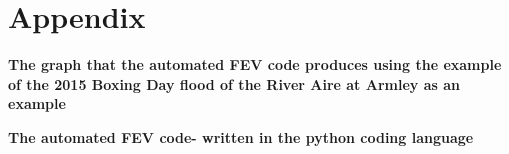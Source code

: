 \documentclass[11pt,a4paper]{article}
\begin{document}
\newpage
\appendix
\section{Appendix}
{\bf The graph that the automated FEV code produces using the example of the 2015 Boxing Day flood of the River Aire at Armley as an example}\\
\begin{figure}[H]
\begin{center}
\end{center}
\end{figure}
{\bf The automated FEV code- written in the python coding language}\\
\begin{spacing}{1}\footnotesize{}
\end{spacing}
\end{document}
